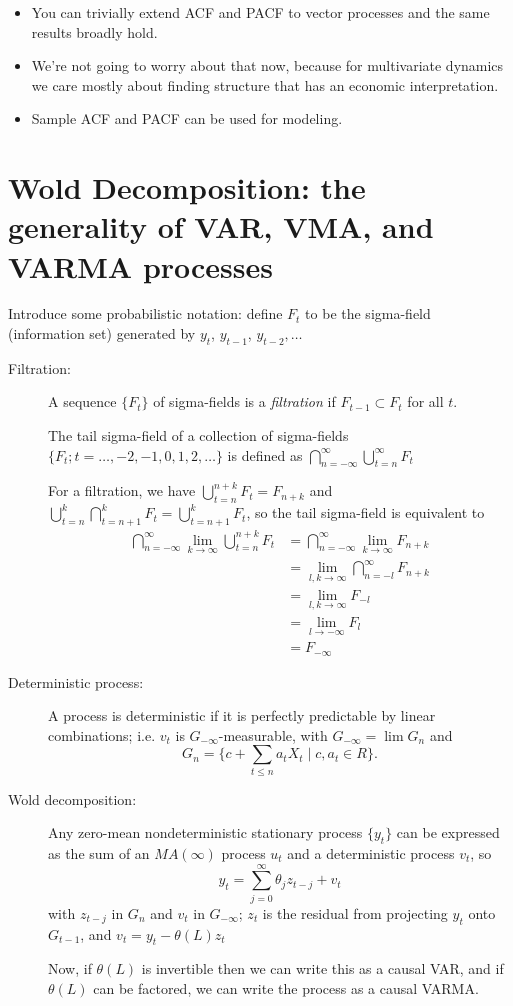 \begin{itemize}
\item You can trivially extend ACF and PACF to vector processes and
  the same results broadly hold.
\item We're not going to worry about that now, because for
  multivariate dynamics we care mostly about finding structure that
  has an economic interpretation.
\item Sample ACF and PACF can be used for modeling.
\end{itemize}

\section{Wold Decomposition: the generality of VAR, VMA, and VARMA
  processes}

Introduce some probabilistic notation: define $F_t$ to be the sigma-field
(information set) generated by $y_t$, $y_{t-1}$, $y_{t-2},…$

\begin{description}
\item[Filtration:]
  A sequence $\{F_t\}$ of sigma-fields is a \emph{filtration} if
  $F_{t-1} ⊂ F_t$ for all $t$.

  The tail sigma-field of a collection of sigma-fields $\{F_t;
  t=…,-2,-1,0,1,2,…\}$ is defined as $⋂_{n=-∞}^∞ ⋃_{t=n}^∞ F_t$

  For a filtration, we have $⋃_{t=n}^{n+k} F_t = F_{n+k}$ and
  $⋃_{t=n}^k ⋂_{t=n+1}^k F_t = ⋃_{t=n+1}^k F_t$, so the tail
  sigma-field is equivalent to
  \begin{align}
    ⋂_{n=-∞}^∞ \lim_{k → ∞} ⋃_{t=n}^{n+k} F_t 
    &= ⋂_{n=-∞}^∞ \lim_{k → ∞} F_{n+k} \\
    &= \lim_{l,k → ∞} ⋂_{n=-l}^∞ F_{n+k} \\
    &= \lim_{l,k → ∞} F_{-l} \\
    &= \lim_{l → -∞} F_l \\
    &= F_{-∞}
  \end{align}

\item[Deterministic process:]
  A process is deterministic if it is perfectly predictable by linear
  combinations; i.e. $v_t$ is $G_{-∞}$-measurable, with $G_{-∞} = \lim
  G_n$ and
  \[G_n = \{c + \sum_{t ≤ n} a_t X_t ∣ c, a_t ∈ R\}.\]
\item[Wold decomposition:]
Any zero-mean nondeterministic stationary process $\{y_t\}$ can be
expressed as the sum of an $MA(∞)$ process $u_t$ and a deterministic
process $v_t$, so
\[y_t = \sum_{j=0}^∞ θ_j z_{t-j} + v_t\]
with $z_{t-j}$ in $G_n$ and $v_t$ in $G_{-∞}$; $z_t$ is the residual
from projecting $y_t$ onto $G_{t-1}$, and $v_t = y_t - θ(L) z_t$

Now, if $θ(L)$ is invertible then we can write this as a causal VAR,
and if $θ(L)$ can be factored, we can write the process as a causal
VARMA.
\end{description}

